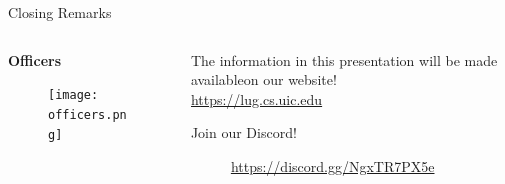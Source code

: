\documentclass{beamer}
\begin{document}
\begin{frame}{Closing Remarks}
	\begin{columns}
		\begin{column}{0.5\textwidth}
			\textbf{Officers}
			\begin{figure}
				\centering
				\texttt{[image: officers.png]}
			\end{figure}
		\end{column}
		\begin{column}{0.5\textwidth}
			The information in this presentation will be made
			available\footnotemark on our website!\\
			\url{https://lug.cs.uic.edu}
			
			\bigskip
			Join our Discord!

			\begin{figure}
				\centering
				
				\caption{\url{https://discord.gg/NgxTR7PX5e}}
			\end{figure}
		\end{column}
	\end{columns}

\end{frame}
\end{document}
